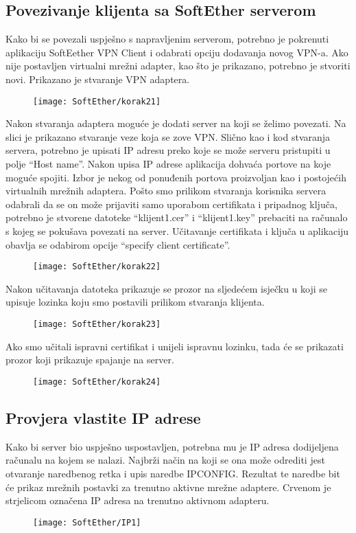 \newpage
\subsection*{Povezivanje klijenta sa SoftEther serverom}
\hspace{0.5cm}
Kako bi se povezali uspješno s napravljenim serverom, potrebno je pokrenuti aplikaciju SoftEether VPN Client i odabrati opciju dodavanja novog VPN-a. Ako nije postavljen virtualni mrežni adapter, kao što je prikazano, potrebno je stvoriti novi. Prikazano je stvaranje VPN adaptera.
\begin{figure}[h!]
     \centering
     \texttt{[image: SoftEther/korak21]}
\end{figure}
\FloatBarrier
Nakon stvaranja adaptera moguće je dodati server na koji se želimo povezati. Na slici je prikazano stvaranje veze koja se zove VPN. Slično kao i kod stvaranja servera, potrebno je upisati IP adresu preko koje se može serveru pristupiti u polje ``Host name''. Nakon upisa IP adrese aplikacija dohvaća portove na koje moguće spojiti. Izbor je nekog od ponuđenih portova proizvoljan kao i postojećih virtualnih mrežnih adaptera. Pošto smo prilikom stvaranja korisnika servera odabrali da se on može prijaviti samo uporabom certifikata i pripadnog ključa, potrebno je stvorene datoteke ``klijent1.cer'' i ``klijent1.key'' prebaciti na računalo s kojeg se pokušava povezati na server. Učitavanje certifikata i ključa u aplikaciju obavlja se odabirom opcije ``specify client certificate''.
\begin{figure}[h!]
     \centering
     \texttt{[image: SoftEther/korak22]}
\end{figure}
\FloatBarrier
Nakon učitavanja datoteka prikazuje se prozor na sljedećem isječku u koji se upisuje lozinka koju smo postavili prilikom stvaranja klijenta.
\begin{figure}[h!]
     \centering
     \texttt{[image: SoftEther/korak23]}
\end{figure}
\FloatBarrier
Ako smo učitali ispravni certifikat i unijeli ispravnu lozinku, tada će se prikazati prozor koji prikazuje spajanje na server.
\begin{figure}[h!]
     \centering
     \texttt{[image: SoftEther/korak24]}
\end{figure}
\FloatBarrier

\FloatBarrier

\subsection*{Provjera vlastite IP adrese}
\hspace{0.5cm}
Kako bi server bio uspješno uspostavljen, potrebna mu je IP adresa dodijeljena računalu na kojem se nalazi. Najbrži način na koji se ona može odrediti jest otvaranje naredbenog retka i upis naredbe IPCONFIG. Rezultat te naredbe bit će prikaz mrežnih postavki za trenutno aktivne mrežne adaptere.
Crvenom je strjelicom označena IP adresa na trenutno aktivnom adapteru.
\begin{figure}[h!]
     \centering
     \texttt{[image: SoftEther/IP1]}
\end{figure}
\FloatBarrier

